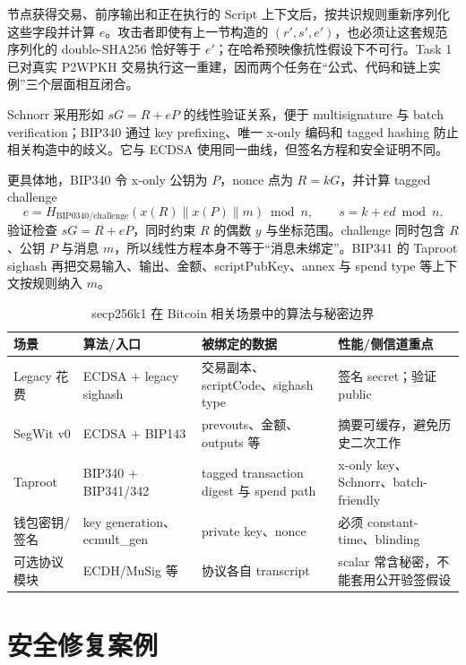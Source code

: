 \documentclass[11pt,a4paper,fontset=none]{ctexart}
\begin{document}
节点获得交易、前序输出和正在执行的 Script 上下文后，按共识规则重新序列化这些字段并计算 $e$。攻击者即使有上一节构造的 $(r',s',e')$，也必须让这套规范序列化的 double-SHA256 恰好等于 $e'$；在哈希预映像抗性假设下不可行。Task 1 已对真实 P2WPKH 交易执行这一重建，因而两个任务在“公式、代码和链上实例”三个层面相互闭合。

Schnorr 采用形如 $sG=R+eP$ 的线性验证关系，便于 multisignature 与 batch verification；BIP340 通过 key prefixing、唯一 x-only 编码和 tagged hashing 防止相关构造中的歧义。它与 ECDSA 使用同一曲线，但签名方程和安全证明不同。

更具体地，BIP340 令 x-only 公钥为 $P$，nonce 点为 $R=kG$，并计算 tagged challenge
\[
e=H_{\mathrm{BIP0340/challenge}}(x(R)\parallel x(P)\parallel m)\bmod n,
\qquad s=k+ed\bmod n.
\]
验证检查 $sG=R+eP$，同时约束 $R$ 的偶数 $y$ 与坐标范围。challenge 同时包含 $R$、公钥 $P$ 与消息 $m$，所以线性方程本身不等于“消息未绑定”。BIP341 的 Taproot sighash 再把交易输入、输出、金额、scriptPubKey、annex 与 spend type 等上下文按规则纳入 $m$。

\begin{table}[htbp]
\centering
\setlength{\tabcolsep}{3pt}
\caption{secp256k1 在 Bitcoin 相关场景中的算法与秘密边界}
\label{tab:bitcoin-usage}
\begin{tabular}{p{}p{}p{}p{}}
\toprule
场景 & 算法/入口 & 被绑定的数据 & 性能/侧信道重点 \\
\midrule
Legacy 花费 & ECDSA + legacy sighash & 交易副本、scriptCode、sighash type & 签名 secret；验证 public \\
SegWit v0 & ECDSA + BIP143 & prevouts、金额、outputs 等 & 摘要可缓存，避免历史二次工作 \\
Taproot & BIP340 + BIP341/342 & tagged transaction digest 与 spend path & x-only key、Schnorr、batch-friendly \\
钱包密钥/签名 & key generation、ecmult\_gen & private key、nonce & 必须 constant-time、blinding \\
可选协议模块 & ECDH/MuSig 等 & 协议各自 transcript & scalar 常含秘密，不能套用公开验签假设 \\
\bottomrule
\end{tabular}
\end{table}

\section{安全修复案例}
\end{document}
